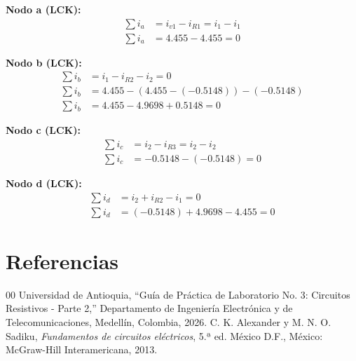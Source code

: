 \documentclass[conference,10pt]{IEEEtran}
\begin{document}
\textbf{Nodo a (LCK):}
\begin{align*}
    \sum i_a &= i_{v1} - i_{R1} = i_1 - i_1 \\
    \sum i_a &= 4.455 - 4.455 = 0
\end{align*}

\textbf{Nodo b (LCK):}
\begin{align*}
    \sum i_b &= i_1 - i_{R2} - i_2 = 0 \\
    \sum i_b &= 4.455 - (4.455 - (-0.5148)) - (-0.5148) \\
    \sum i_b &= 4.455 - 4.9698 + 0.5148 = 0
\end{align*}

\textbf{Nodo c (LCK):}
\begin{align*}
    \sum i_c &= i_2 - i_{R3} = i_2 - i_2 \\
    \sum i_c &= -0.5148 - (-0.5148) = 0
\end{align*}

\textbf{Nodo d (LCK):}
\begin{align*}
    \sum i_d &= i_2 + i_{R2} - i_1 = 0 \\
    \sum i_d &= (-0.5148) + 4.9698 - 4.455 = 0
\end{align*}

\section{Referencias}
\begin{thebibliography}{00}
  Universidad de Antioquia, ``Guía de Práctica de Laboratorio No. 3: Circuitos Resistivos - Parte 2,'' Departamento de Ingeniería Electrónica y de Telecomunicaciones, Medellín, Colombia, 2026.
  C. K. Alexander y M. N. O. Sadiku, \emph{Fundamentos de circuitos eléctricos}, 5.ª ed. México D.F., México: McGraw-Hill Interamericana, 2013.
\end{thebibliography}
\end{document}
